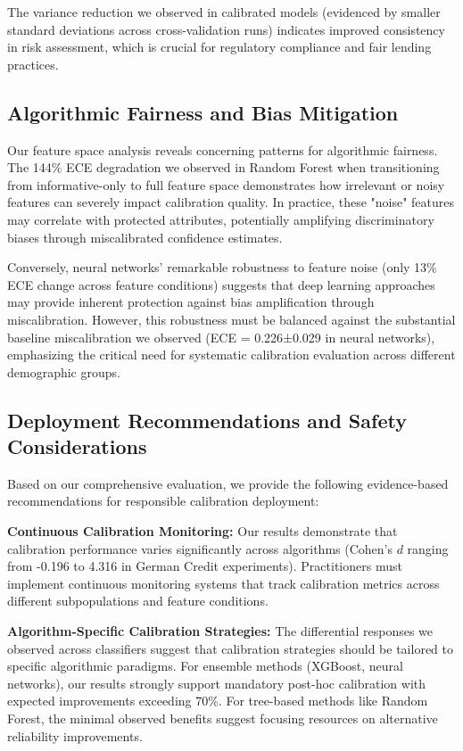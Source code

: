 \documentclass[12pt, a4paper]{article}
\begin{document}
The variance reduction we observed in calibrated models (evidenced by smaller standard deviations across cross-validation runs) indicates improved consistency in risk assessment, which is crucial for regulatory compliance and fair lending practices.

\subsection{Algorithmic Fairness and Bias Mitigation}

Our feature space analysis reveals concerning patterns for algorithmic fairness. The 144\% ECE degradation we observed in Random Forest when transitioning from informative-only to full feature space demonstrates how irrelevant or noisy features can severely impact calibration quality. In practice, these "noise" features may correlate with protected attributes, potentially amplifying discriminatory biases through miscalibrated confidence estimates.

Conversely, neural networks' remarkable robustness to feature noise (only 13\% ECE change across feature conditions) suggests that deep learning approaches may provide inherent protection against bias amplification through miscalibration. However, this robustness must be balanced against the substantial baseline miscalibration we observed (ECE = 0.226±0.029 in neural networks), emphasizing the critical need for systematic calibration evaluation across different demographic groups.

\subsection{Deployment Recommendations and Safety Considerations}

Based on our comprehensive evaluation, we provide the following evidence-based recommendations for responsible calibration deployment:

\textbf{Continuous Calibration Monitoring:} Our results demonstrate that calibration performance varies significantly across algorithms (Cohen's $d$ ranging from -0.196 to 4.316 in German Credit experiments). Practitioners must implement continuous monitoring systems that track calibration metrics across different subpopulations and feature conditions.

\textbf{Algorithm-Specific Calibration Strategies:} The differential responses we observed across classifiers suggest that calibration strategies should be tailored to specific algorithmic paradigms. For ensemble methods (XGBoost, neural networks), our results strongly support mandatory post-hoc calibration with expected improvements exceeding 70\%. For tree-based methods like Random Forest, the minimal observed benefits suggest focusing resources on alternative reliability improvements.
\end{document}

